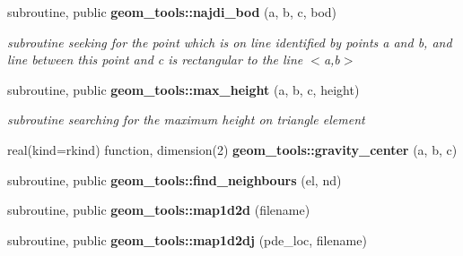\begin{DoxyCompactItemize}
subroutine, public {\bf geom\+\_\+tools\+::najdi\+\_\+bod} (a, b, c, bod)
\begin{DoxyCompactList}\small\item\em subroutine seeking for the point which is on line identified by points a and b, and line between this point and c is rectangular to the line $<$a,b$>$ \end{DoxyCompactList}\item 
subroutine, public {\bf geom\+\_\+tools\+::max\+\_\+height} (a, b, c, height)
\begin{DoxyCompactList}\small\item\em subroutine searching for the maximum height on triangle element \end{DoxyCompactList}\item 
real(kind=rkind) function, dimension(2) {\bf geom\+\_\+tools\+::gravity\+\_\+center} (a, b, c)
\item 
subroutine, public {\bf geom\+\_\+tools\+::find\+\_\+neighbours} (el, nd)
\item 
subroutine, public {\bf geom\+\_\+tools\+::map1d2d} (filename)
\item 
subroutine, public {\bf geom\+\_\+tools\+::map1d2dj} (pde\+\_\+loc, filename)
\end{DoxyCompactItemize}
